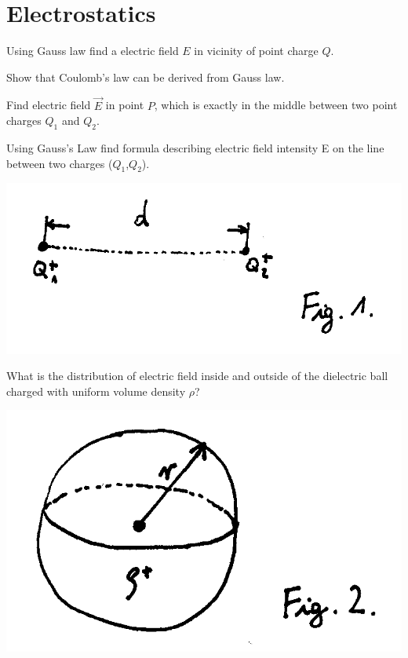 \section{Electrostatics}


\begin{Exercise}[difficulty=1]
Using Gauss law find a electric field $E$ in vicinity of point charge $Q$.
\end{Exercise}

\begin{Exercise}[difficulty=2]
Show that Coulomb's law can be derived from Gauss law.
\end{Exercise}

\begin{Exercise}[difficulty=2]
Find electric field $\vec{E}$ in point $P$, which is exactly in the middle between two point charges $Q_1$ and $Q_2$. 
\end{Exercise}

\begin{Exercise}[difficulty=3]
Using Gauss's Law find formula describing electric field intensity E on the line between two charges ($Q_1$,$Q_2$). 
\begin{center}
\includegraphics[scale=0.3]{img/fig_e1.png} 
\end{center}
\end{Exercise}

\begin{Exercise}[difficulty=3]
What is the distribution of electric field inside and outside of the dielectric ball charged with uniform volume density $\rho$?
\begin{center}
\includegraphics[scale=0.3]{img/fig_e2.png} 
\end{center}
\end{Exercise}

